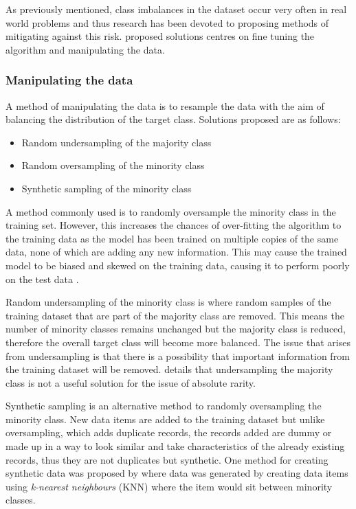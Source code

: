 As previously mentioned, class imbalances in the dataset occur very often in real world problems and thus research has been devoted to proposing methods of mitigating against this risk. \cite{chawla_editorial:_2004} proposed solutions centres on fine tuning the algorithm and manipulating the data. 

\subsubsection{Manipulating the data} \label{sec:dataManip}

A method of manipulating the data is to resample the data with the aim of balancing the distribution of the target class. Solutions proposed are as follows:

\begin{itemize}
	\item Random undersampling of the majority class
	\item Random oversampling of the minority class
	\item Synthetic sampling of the minority class 
\end{itemize}

A method commonly used is to randomly oversample the minority class in the training set. However, this increases the chances of over-fitting the algorithm to the training data as the model has been trained on multiple copies of the same data, none of which are adding any new information. This may cause the trained model to be biased and skewed on the training data, causing it to perform poorly on the test data \cite[See][]{hawkins_problem_2004}.

Random undersampling of the minority class is where random samples of the training dataset that are part of the majority class are removed. This means the number of minority classes remains unchanged but the majority class is reduced, therefore the overall target class will become more balanced. The issue that arises from undersampling is that there is a possibility that important information from the training dataset will be removed. \cite{kennedy_credit_2013} details that undersampling the majority class is not a useful solution for the issue of absolute rarity.

Synthetic sampling is an alternative method to randomly oversampling the minority class. New data items are added to the training dataset but unlike oversampling, which adds duplicate records, the records added are dummy or made up in a way to look similar and take characteristics of the already existing records, thus they are not duplicates but synthetic. One method for creating synthetic data was proposed by \citep{chawla_smote:_2002} where data was generated by creating data items using \textit{k-nearest neighbours} (KNN) where the item would sit between minority classes.

